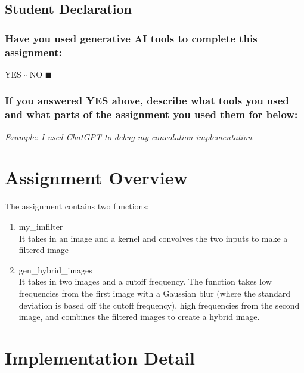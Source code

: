 \subsection*{Student Declaration}

\subsubsection*{Have you used generative AI tools to complete this assignment:}


YES $\square$ NO $\blacksquare$ %


\subsubsection*{If you answered YES above, describe what tools you used and what parts of the assignment you used them for below:}


\textit{Example: I used ChatGPT to debug my convolution implementation}


\newpage

\section*{Assignment Overview}

The assignment contains two functions:
\begin{enumerate}
    \item my\_imfilter \\
    It takes in an image and a kernel and convolves the two inputs to make a filtered image
    \item gen\_hybrid\_images \\
    It takes in two images and a cutoff frequency. The function takes low frequencies from the first image with a Gaussian blur (where the standard deviation is based off the cutoff frequency), high frequencies from the second image, and combines the filtered images to create a hybrid image.
\end{enumerate}

\section*{Implementation Detail}

